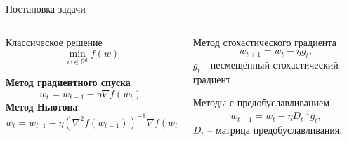 \documentclass[aspectratio=169, 12pt]{beamer}
\begin{document}
\begin{frame}{Постановка задачи}
     \begin{columns}[t]
    \begin{column}{0.48\textwidth}
        \vspace{-0.5cm}
        \begin{block}{Классическое решение}
        \begin{equation}
        \label{eq:general}
            \min_{w \in \mathbb{R}^d} f(w)
        \end{equation} 
        \end{block}
        \textbf{Метод градиентного спуска}
        \begin{equation*}
            w_t = w_{t-1} - \eta \nabla f(w_t).
        \end{equation*}
        \textbf{Метод Ньютона}:
        \begin{equation*}
            w_t = w_{t_-1} - \eta \left( \nabla^2 f(w_{t-1}) \right)^{-1} \nabla f(w_{t-1})
        \end{equation*}
    \end{column}
    \hspace{0.5cm}
    \vrule
    \hspace{0.5cm}
    \begin{column}{0.48\textwidth}
        \vspace{-0.5cm}
        \begin{block}{Метод стохастического градиента}
        \begin{equation*}
            w_{t+1} = w_t - \eta g_t,
        \end{equation*}
        $g_t$ - несмещённый стохастический градиент
        \end{block}
        
        \begin{block}{Методы с предобуславливанием}
        \begin{equation*}
            w_{t+1} = w_t - \eta D_t^{-1}g_t,
        \end{equation*}
        $D_t$ -- матрица предобуславливания.
        \end{block}
    \end{column}
\end{columns}
\end{frame}
\end{document}
